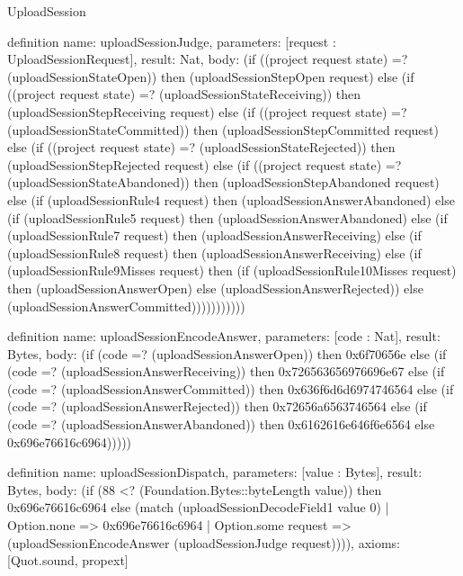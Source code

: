 \begin{lexlean}{UploadSession}
\begin{semanticmodule}
definition{
  name: uploadSessionJudge,
  parameters: [request : UploadSessionRequest],
  result: Nat,
  body: (if ((project request state) =? (uploadSessionStateOpen)) then (uploadSessionStepOpen request) else (if ((project request state) =? (uploadSessionStateReceiving)) then (uploadSessionStepReceiving request) else (if ((project request state) =? (uploadSessionStateCommitted)) then (uploadSessionStepCommitted request) else (if ((project request state) =? (uploadSessionStateRejected)) then (uploadSessionStepRejected request) else (if ((project request state) =? (uploadSessionStateAbandoned)) then (uploadSessionStepAbandoned request) else (if (uploadSessionRule4 request) then (uploadSessionAnswerAbandoned) else (if (uploadSessionRule5 request) then (uploadSessionAnswerAbandoned) else (if (uploadSessionRule7 request) then (uploadSessionAnswerReceiving) else (if (uploadSessionRule8 request) then (uploadSessionAnswerReceiving) else (if (uploadSessionRule9Misses request) then (if (uploadSessionRule10Misses request) then (uploadSessionAnswerOpen) else (uploadSessionAnswerRejected)) else (uploadSessionAnswerCommitted)))))))))))
}

definition{
  name: uploadSessionEncodeAnswer,
  parameters: [code : Nat],
  result: Bytes,
  body: (if (code =? (uploadSessionAnswerOpen)) then 0x6f70656e else (if (code =? (uploadSessionAnswerReceiving)) then 0x726563656976696e67 else (if (code =? (uploadSessionAnswerCommitted)) then 0x636f6d6d6974746564 else (if (code =? (uploadSessionAnswerRejected)) then 0x72656a6563746564 else (if (code =? (uploadSessionAnswerAbandoned)) then 0x6162616e646f6e6564 else 0x696e76616c6964)))))
}

definition{
  name: uploadSessionDispatch,
  parameters: [value : Bytes],
  result: Bytes,
  body: (if (88 <? (Foundation.Bytes::byteLength value)) then 0x696e76616c6964 else (match (uploadSessionDecodeField1 value 0)
    | Option.none => 0x696e76616c6964
    | Option.some request => (uploadSessionEncodeAnswer (uploadSessionJudge request)))),
  axioms: [Quot.sound, propext]
}
\end{semanticmodule}
\end{lexlean}

